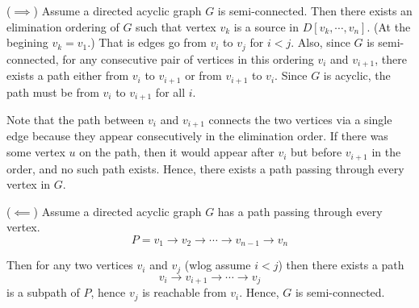\documentclass[12pt]{article}
\begin{document}
\begin{solution}
    \bbni

     ($\implies$)
     Assume a directed acyclic graph $G$ is semi-connected. Then there exists an elimination ordering of $G$ such that vertex $v_k$ is a source in $D[v_k, \cdots, v_n]$. (At the begining $v_k = v_1$.) That is edges go from $v_i$ to $v_j$ for $i < j$. Also, since $G$ is semi-connected, for any consecutive pair of vertices in this ordering $v_i$ and $v_{i+1}$, there exists a path either from $v_i$ to $v_{i+1}$ or from $v_{i+1}$ to $v_i$. Since $G$ is acyclic, the path must be from $v_i$ to $v_{i+1}$ for all $i$. 

     Note that the path between $v_i$ and $v_{i+1}$ connects the two vertices via a single edge because they appear consecutively in the elimination order. If there was some vertex $u$ on the path, then it would appear after $v_i$ but before $v_{i+1}$ in the order, and no such path exists. Hence, there exists a path passing through every vertex in $G$. 
    \bbni

     ($\impliedby$)
     Assume a directed acyclic graph $G$ has a path passing through every vertex. 
     \[P = v_1 \to v_2 \to \cdots \to v_{n-1} \to v_n\]

     Then for any two vertices $v_i$ and $v_j$ (wlog assume $i < j$) then there exists a path \[v_i \to v_{i+1} \to \cdots \to v_j\] is a subpath of $P$, hence $v_j$ is reachable from $v_i$. Hence, $G$ is semi-connected.
\end{solution}
\end{document}
